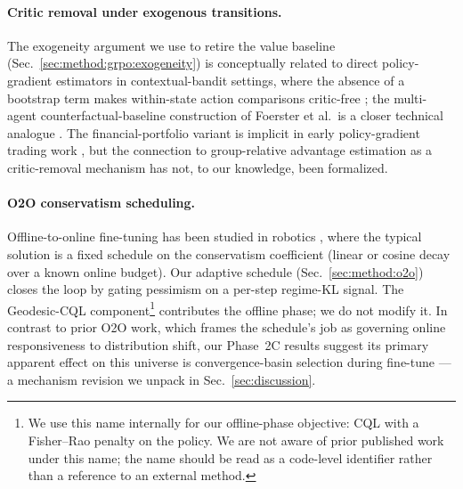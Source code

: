 \paragraph{Critic removal under exogenous transitions.} The exogeneity
argument we use to retire the value baseline (Sec.~\ref{sec:method:grpo:exogeneity})
is conceptually related to direct policy-gradient estimators in
contextual-bandit settings, where the absence of a bootstrap term
makes within-state action comparisons critic-free
\citep{dudik2014doubly,joachims2018deep}; the multi-agent
counterfactual-baseline construction of Foerster et al.\ is a closer
technical analogue \citep{foerster2018counterfactual}. The
financial-portfolio variant is implicit in early policy-gradient
trading work \citep{moody2001learning}, but the connection to
group-relative advantage estimation as a critic-removal mechanism has
not, to our knowledge, been formalized.

\paragraph{O2O conservatism scheduling.} Offline-to-online fine-tuning
has been studied in robotics
\citep{nair2020awac,zheng2023adaptive}, where the
typical solution is a fixed schedule on the conservatism coefficient
(linear or cosine decay over a known online budget). Our adaptive
schedule (Sec.~\ref{sec:method:o2o}) closes the loop by gating
pessimism on a per-step regime-KL signal. The Geodesic-CQL
component\footnote{We use this name internally for our offline-phase
objective: CQL with a Fisher--Rao penalty on the policy. We are not
aware of prior published work under this name; the name should be
read as a code-level identifier rather than a reference to an external
method.} contributes the offline
phase; we do not modify it. In contrast to prior O2O work, which frames
the schedule's job as governing online responsiveness to distribution
shift, our Phase~2C results suggest its primary apparent effect on this
universe is convergence-basin selection during fine-tune --- a
mechanism revision we unpack in Sec.~\ref{sec:discussion}.
